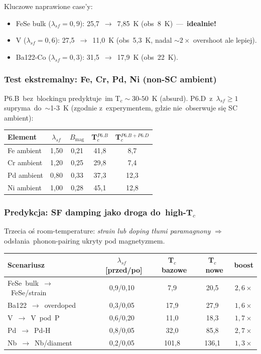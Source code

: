 Kluczowe naprawione case'y:
\begin{itemize}\itemsep0pt
  \item FeSe bulk ($\lambda_{sf}\!=\!0{,}9$): 25{,}7~$\to$~7{,}85~K
    (obs~8~K)~---~\textbf{idealnie!}
  \item V ($\lambda_{sf}\!=\!0{,}6$): 27{,}5~$\to$~11{,}0~K (obs~5{,}3~K,
    nadal $\sim\!2\times$ overshoot ale lepiej).
  \item Ba122-Co ($\lambda_{sf}\!=\!0{,}3$): 31{,}5~$\to$~17{,}9~K (obs~22~K).
\end{itemize}

\subsubsection{Test ekstremalny: Fe, Cr, Pd, Ni (non-SC ambient)}

P6.B~bez~blockingu predyktuje~im T$_c\!\sim\!30$-$50$~K (absurd).
P6.D~z~$\lambda_{sf}\!\ge\!1$ supryma~do~$\sim$1-3~K (zgodnie z~experymentem,
gdzie nie~obserwuje si\k{e} SC ambient):

\begin{center}
\begin{tabular}{lcccc}
\toprule
Element & $\lambda_{sf}$ & $B_\text{mag}$ & T$_c^{P6.B}$ & T$_c^{P6.B+P6.D}$ \\
\midrule
Fe ambient  & 1{,}50 & 0{,}21 & 41{,}8 & 8{,}7  \\
Cr ambient  & 1{,}20 & 0{,}25 & 29{,}8 & 7{,}4  \\
Pd ambient  & 0{,}80 & 0{,}33 & 37{,}3 & 12{,}3 \\
Ni ambient  & 1{,}00 & 0{,}28 & 45{,}1 & 12{,}8 \\
\bottomrule
\end{tabular}
\end{center}

\subsubsection{Predykcja: SF damping jako droga do~high-T$_c$}

Trzecia o\'s room-temperature: \emph{strain lub doping t\l{}umi paramagnony}
$\Rightarrow$ ods\l{}ania~phonon-pairing ukryty pod magnetyzmem.

\begin{center}
\begin{tabular}{lcccc}
\toprule
Scenariusz & $\lambda_{sf}$~[przed/po] & T$_c$~bazowe & T$_c$~nowe & boost \\
\midrule
FeSe~bulk~$\to$~FeSe/strain  & 0{,}9/0{,}10 & 7{,}9   & 20{,}5  & $2{,}6\times$ \\
Ba122~$\to$~overdoped        & 0{,}3/0{,}05 & 17{,}9  & 27{,}9  & $1{,}6\times$ \\
V~$\to$~V~pod~P              & 0{,}6/0{,}20 & 11{,}0  & 18{,}3  & $1{,}7\times$ \\
Pd~$\to$~Pd-H                & 0{,}8/0{,}05 & 32{,}0  & 85{,}8  & $2{,}7\times$ \\
Nb~$\to$~Nb/diament          & 0{,}2/0{,}05 & 101{,}8 & 136{,}1 & $1{,}3\times$ \\
\bottomrule
\end{tabular}
\end{center}

